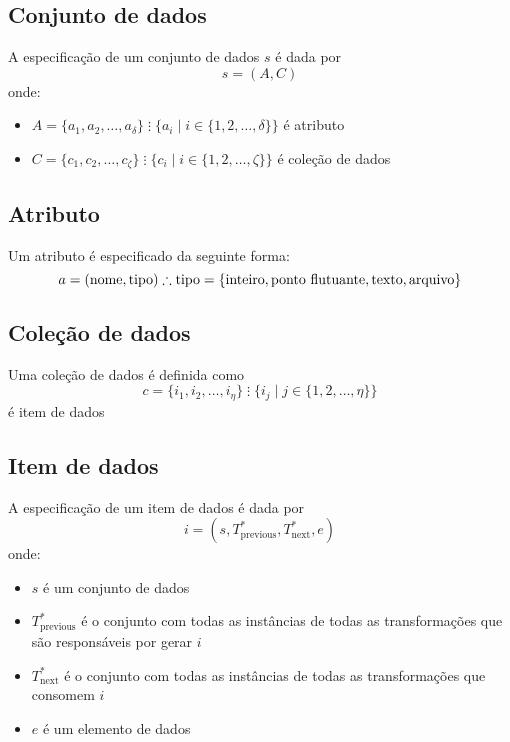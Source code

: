 \subsection{Conjunto de dados}

A especificação de um conjunto de dados \( s \) é dada por \[ s = (A, C) \] onde:
\begin{itemize}
    \item \( A = \{a_1, a_2, \ldots, a_{\delta} \} \; \vdots{} \; \{ a_i \mid i \in \{1, 2, \ldots, \delta \} \} \) é atributo
    \item \( C = \{c_1, c_2, \ldots, c_{\zeta} \} \; \vdots{} \; \{ c_i \mid i \in \{1, 2, \ldots, \zeta \} \} \) é coleção de dados
\end{itemize}

\subsection{Atributo}

Um atributo é especificado da seguinte forma: \[ a = (\textrm{nome},\textrm{tipo}) \therefore \textrm{tipo} = \{\textup{inteiro}, \textup{ponto flutuante}, \textup{texto}, \textup{arquivo}\} \]

\subsection{Coleção de dados}

Uma coleção de dados é definida como \[ c = \{ i_1, i_2, \ldots, i_{\eta} \} \; \vdots \; \{ i_j \mid j \in \{ 1, 2, \ldots, \eta \} \} \] é item de dados

\subsection{Item de dados}

A especificação de um item de dados é dada por \[ i = (s, T^{\ast}_{\textrm{previous}}, T^{\ast}_{\textrm{next}}, e) \] onde:

\begin{itemize}
    \item \( s \) é um conjunto de dados
    \item \( T^{\ast}_{\textrm{previous}} \) é o conjunto com todas as instâncias de todas as transformações que são responsáveis por gerar \( i \)
    \item \( T^{\ast}_{\textrm{next}} \) é o conjunto com todas as instâncias de todas as transformações que consomem \( i \)
    \item \( e \) é um elemento de dados
\end{itemize}

